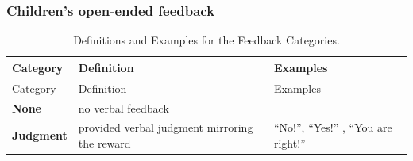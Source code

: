 \documentclass[floatsintext,man]{apa6}
\theoremstyle{definition}
\theoremstyle{definition}
\theoremstyle{definition}
\theoremstyle{remark}
\begin{document}
\subsubsection{Children's open-ended
feedback}\label{childrens-open-ended-feedback}

\begin{longtable}[]{@{}lll@{}}
\caption{\label{tab:feedbackCat} Definitions and Examples for the Feedback
Categories.}\tabularnewline
\toprule
\begin{minipage}[b]{0.15\columnwidth}\raggedright\strut
Category\strut
\end{minipage} & \begin{minipage}[b]{0.45\columnwidth}\raggedright\strut
Definition\strut
\end{minipage} & \begin{minipage}[b]{0.31\columnwidth}\raggedright\strut
Examples\strut
\end{minipage}\tabularnewline
\midrule
\endfirsthead
\toprule
\begin{minipage}[b]{0.15\columnwidth}\raggedright\strut
Category\strut
\end{minipage} & \begin{minipage}[b]{0.45\columnwidth}\raggedright\strut
Definition\strut
\end{minipage} & \begin{minipage}[b]{0.31\columnwidth}\raggedright\strut
Examples\strut
\end{minipage}\tabularnewline
\midrule
\endhead
\begin{minipage}[t]{0.15\columnwidth}\raggedright\strut
\textbf{None}\strut
\end{minipage} & \begin{minipage}[t]{0.45\columnwidth}\raggedright\strut
no verbal feedback\strut
\end{minipage} & \begin{minipage}[t]{0.31\columnwidth}\raggedright\strut
\strut
\end{minipage}\tabularnewline
\begin{minipage}[t]{0.15\columnwidth}\raggedright\strut
\textbf{Judgment}\strut
\end{minipage} & \begin{minipage}[t]{0.45\columnwidth}\raggedright\strut
provided verbal judgment mirroring the reward\strut
\end{minipage} & \begin{minipage}[t]{0.31\columnwidth}\raggedright\strut
\enquote{No!}, \enquote{Yes!} , \enquote{You are right!}\strut

\end{minipage}
\end{longtable}
\end{document}
